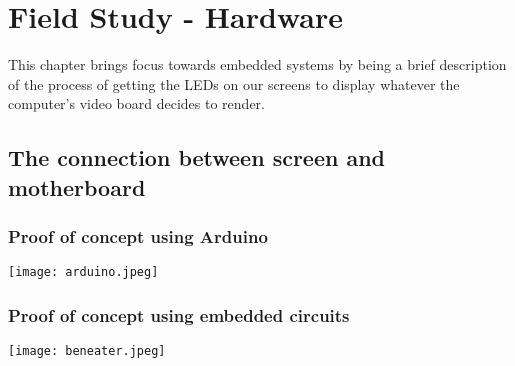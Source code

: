 


\chapter*{Field Study - Hardware}
  This chapter brings focus towards embedded systems by being a brief description of the process of getting the LEDs on our screens to display whatever the computer's video board decides to render. 
  \section*{The connection between screen and motherboard}
    \subsection*{Proof of concept using Arduino}
      \texttt{[image: arduino.jpeg]}
    \subsection*{Proof of concept using embedded circuits}
      \texttt{[image: beneater.jpeg]}

